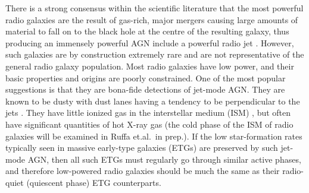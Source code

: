 \documentclass[a4paper,fleqn,usenatbib]{mnras}
\begin{document}
	There is a strong consensus within the scientific literature that the most powerful radio galaxies are the result of gas-rich, major mergers causing large amounts of material to fall on to the black hole at the centre of the resulting galaxy, thus producing an immensely powerful AGN include a powerful radio jet \citep[e.g.][]{Malin1983, Quillen1992, Lim2000}. However, such galaxies are by construction extremely rare and are not representative of the general radio galaxy population. Most radio galaxies have low power, and their basic properties and origins are poorly constrained. One of the most popular suggestions is that they are bona-fide detections of jet-mode AGN.%
	They are known to be dusty with dust lanes having a tendency to be perpendicular to the jets \citep[e.g.][]{DeRuiter2002, VerdoesKleijn2005}. They have little ionized gas in the interstellar medium (ISM) \citep[e.g.][]{}, but often have significant quantities of hot X-ray gas \citep[e.g.][]{} (the cold phase of the ISM of radio galaxies will be examined in Ruffa et.al.\ in prep.). If the low star-formation rates typically seen in massive early-type galaxies (ETGs) are preserved by such jet-mode AGN, then all such ETGs must regularly go through similar active phases, and therefore low-powered radio galaxies should be much the same as their radio-quiet (quiescent phase) ETG counterparts. 


\end{document}
